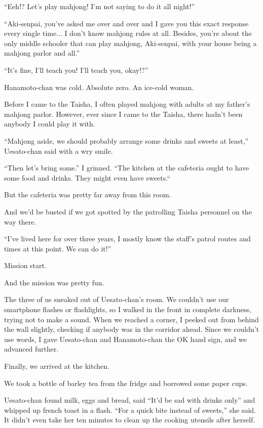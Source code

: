 ``Eeh!? Let's play mahjong! I'm not saying to do it all night!''

``Aki-senpai, you've asked me over and over and I gave you this exact response every single time... I don't know mahjong rules at all. Besides, you're about the only middle schooler that can play mahjong, Aki-senpai, with your house being a mahjong parlor and all.''

``It's fine, I'll teach you! I'll teach you, okay!?''

Hanamoto-chan was cold. Absolute zero. An ice-cold woman.

Before I came to the Taisha, I often played mahjong with adults at my father's mahjong parlor. However, ever since I came to the Taisha, there hadn't been anybody I could play it with.

``Mahjong aside, we should probably arrange some drinks and sweets at least,'' Uesato-chan said with a wry smile.

``Then let's bring some.'' I grinned. ``The kitchen at the cafeteria ought to have some food and drinks. They might even have sweets.``

But the cafeteria was pretty far away from this room.

And we'd be busted if we got spotted by the patrolling Taisha personnel on the way there.

``I've lived here for over three years, I mostly know the staff's patrol routes and times at this point. We can do it!''

Mission start.

And the mission was pretty fun.

The three of us sneaked out of Uesato-chan's room. We couldn't use our smartphone flashes or flashlights, so I walked in the front in complete darkness, trying not to make a sound. When we reached a corner, I peeked out from behind the wall slightly, checking if anybody was in the corridor ahead. Since we couldn't use words, I gave Uesato-chan and Hanamoto-chan the OK hand sign, and we advanced further.

Finally, we arrived at the kitchen.

We took a bottle of barley tea from the fridge and borrowed some paper cups.

Uesato-chan found milk, eggs and bread, said ``It'd be sad with drinks only'' and whipped up french toast in a flash. ``For a quick bite instead of sweets,'' she said. It didn't even take her ten minutes to clean up the cooking utensils after herself.

